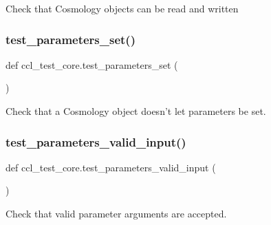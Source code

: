 \begin{DoxyVerb}Check that Cosmology objects can be read and written\end{DoxyVerb}
 \mbox{\label{namespaceccl__test__core_a6d316a5e78c5a180dfc4b6887fa0b9f8}} 
\subsubsection{\texorpdfstring{test\+\_\+parameters\+\_\+set()}{test\_parameters\_set()}}
{\footnotesize\ttfamily def ccl\+\_\+test\+\_\+core.\+test\+\_\+parameters\+\_\+set (\begin{DoxyParamCaption}{ }\end{DoxyParamCaption})}

\begin{DoxyVerb}Check that a Cosmology object doesn't let parameters be set.
\end{DoxyVerb}
 \mbox{\label{namespaceccl__test__core_a5d78733a80588dd665203627d89b0b6f}} 
\subsubsection{\texorpdfstring{test\+\_\+parameters\+\_\+valid\+\_\+input()}{test\_parameters\_valid\_input()}}
{\footnotesize\ttfamily def ccl\+\_\+test\+\_\+core.\+test\+\_\+parameters\+\_\+valid\+\_\+input (\begin{DoxyParamCaption}{ }\end{DoxyParamCaption})}

\begin{DoxyVerb}Check that valid parameter arguments are accepted.
\end{DoxyVerb}
 